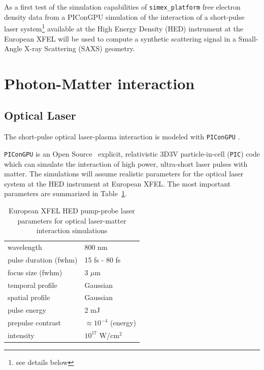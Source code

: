 \documentclass[12pt]{scrartcl}
\begin{document}
As a first test of the simulation capabilities of \texttt{simex\_platform}
free electron density data from a PIConGPU simulation of the interaction of a
short-pulse laser system\footnote{see details below} available at the High
Energy Density (HED) instrument \cite{Nakatsutsumi2014} at the European XFEL
will be used to compute a synthetic scattering signal in a Small-Angle X-ray
Scattering (SAXS) geometry.
%
\section{Photon-Matter interaction}
\subsection{Optical Laser}
The short-pulse
optical laser-plasma interaction is modeled with \texttt{PIConGPU}
\cite{Bussmann2013}.

\texttt{PIConGPU} is an Open Source~\cite{picongpu_github} explicit,
relativistic 3D3V particle-in-cell (\texttt{PIC}) code which can simulate the
interaction of high power, ultra-short laser pulses with matter.  The
simulations will assume realistic parameters for the optical laser system at the
HED instrument at European XFEL. The most important parameters are summarized in
Table~\ref{tab:short_pulse_laser_parameters}.
\begin{table}[h]
\centering
\begin{tabular}{|l|l|}
  \hline wavelength & 800 nm \\
  pulse duration (fwhm) & 15 fs - 80 fs \\
  focus size (fwhm)  & 3 $\mu\text{m}$ \\
  temporal profile &  Gaussian \\
  spatial profile &  Gaussian \\
  pulse energy & 2 mJ \\
  prepulse contrast & $\approx 10^{-4}$ (energy)\\
  intensity  & $10^{17}$ W/cm$^2$ \\
  \hline
\end{tabular}
\caption{European XFEL HED pump-probe laser parameters for optical laser-matter interaction
simulations}
\label{tab:short_pulse_laser_parameters}
\end{table}
\end{document}
